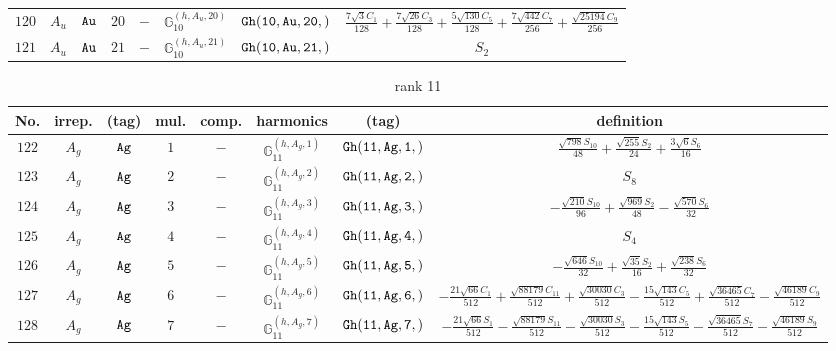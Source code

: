 \documentclass[fleqn,8pt]{jsarticle}
\begin{document}
\begin{table}[ht!]
\begin{center}
\begin{tabular}{cccccccc}
$ 120 $ & $ A_{u} $ & $ {\tt Au} $ & $ 20 $ & $ - $ & $ \mathbb{G}_{10}^{(h,A_{u},20)} $ & $ {\tt Gh(10,Au,20,)} $ & $ \frac{7 \sqrt{3} C_{1}}{128} + \frac{7 \sqrt{26} C_{3}}{128} + \frac{5 \sqrt{130} C_{5}}{128} + \frac{7 \sqrt{442} C_{7}}{256} + \frac{\sqrt{25194} C_{9}}{256} $ \\
$ 121 $ & $ A_{u} $ & $ {\tt Au} $ & $ 21 $ & $ - $ & $ \mathbb{G}_{10}^{(h,A_{u},21)} $ & $ {\tt Gh(10,Au,21,)} $ & $ S_{2} $ \\
 \hline \hline
\end{tabular}
\end{center}
\end{table}
\begin{table}[ht!]
\begin{center}
\caption{rank 11}
\renewcommand{\arraystretch}{1.3}
\begin{tabular}{cccccccc} \hline \hline
No. & irrep. & (tag) & mul. & comp. & harmonics & (tag) & definition \\ \hline
$ 122 $ & $ A_{g} $ & $ {\tt Ag} $ & $ 1 $ & $ - $ & $ \mathbb{G}_{11}^{(h,A_{g},1)} $ & $ {\tt Gh(11,Ag,1,)} $ & $ \frac{\sqrt{798} S_{10}}{48} + \frac{\sqrt{255} S_{2}}{24} + \frac{3 \sqrt{6} S_{6}}{16} $ \\
$ 123 $ & $ A_{g} $ & $ {\tt Ag} $ & $ 2 $ & $ - $ & $ \mathbb{G}_{11}^{(h,A_{g},2)} $ & $ {\tt Gh(11,Ag,2,)} $ & $ S_{8} $ \\
$ 124 $ & $ A_{g} $ & $ {\tt Ag} $ & $ 3 $ & $ - $ & $ \mathbb{G}_{11}^{(h,A_{g},3)} $ & $ {\tt Gh(11,Ag,3,)} $ & $ - \frac{\sqrt{210} S_{10}}{96} + \frac{\sqrt{969} S_{2}}{48} - \frac{\sqrt{570} S_{6}}{32} $ \\
$ 125 $ & $ A_{g} $ & $ {\tt Ag} $ & $ 4 $ & $ - $ & $ \mathbb{G}_{11}^{(h,A_{g},4)} $ & $ {\tt Gh(11,Ag,4,)} $ & $ S_{4} $ \\
$ 126 $ & $ A_{g} $ & $ {\tt Ag} $ & $ 5 $ & $ - $ & $ \mathbb{G}_{11}^{(h,A_{g},5)} $ & $ {\tt Gh(11,Ag,5,)} $ & $ - \frac{\sqrt{646} S_{10}}{32} + \frac{\sqrt{35} S_{2}}{16} + \frac{\sqrt{238} S_{6}}{32} $ \\
$ 127 $ & $ A_{g} $ & $ {\tt Ag} $ & $ 6 $ & $ - $ & $ \mathbb{G}_{11}^{(h,A_{g},6)} $ & $ {\tt Gh(11,Ag,6,)} $ & $ - \frac{21 \sqrt{66} C_{1}}{512} + \frac{\sqrt{88179} C_{11}}{512} + \frac{\sqrt{30030} C_{3}}{512} - \frac{15 \sqrt{143} C_{5}}{512} + \frac{\sqrt{36465} C_{7}}{512} - \frac{\sqrt{46189} C_{9}}{512} $ \\
$ 128 $ & $ A_{g} $ & $ {\tt Ag} $ & $ 7 $ & $ - $ & $ \mathbb{G}_{11}^{(h,A_{g},7)} $ & $ {\tt Gh(11,Ag,7,)} $ & $ - \frac{21 \sqrt{66} S_{1}}{512} - \frac{\sqrt{88179} S_{11}}{512} - \frac{\sqrt{30030} S_{3}}{512} - \frac{15 \sqrt{143} S_{5}}{512} - \frac{\sqrt{36465} S_{7}}{512} - \frac{\sqrt{46189} S_{9}}{512} $ \\

\end{tabular}
\end{center}
\end{table}
\end{document}
